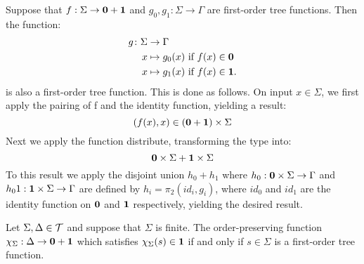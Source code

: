 \bigskip
\noindent \begin{example} Suppose that $f : \Sigma \to \mathbf{0}+\mathbf{1}$ and $g_0, g_1 : \Sigma \to\Gamma$ are first-order tree functions. Then the function:
 \begin{align*}
  g\colon \Sigma &\to \Gamma \\
  x &\mapsto g_0(x)  \text{ if } f(x)\in\mathbf{0}\\
  x &\mapsto g_1(x)  \text{ if } f(x)\in\mathbf{1}.
\end{align*}
 is also a first-order tree function. This is done as follows. On input
$x\in\Sigma$, we first apply the pairing of f and the identity function, yielding a result:
$$ (f(x),x)\in(\mathbf{0}+\mathbf{1})\times\Sigma$$
Next we apply the function distribute, transforming the type into:
$$ \mathbf{0}\times\Sigma+\mathbf{1}\times\Sigma$$
To this result we apply the disjoint union $h_0 + h_1$ where $h_0:\mathbf{0}\times\Sigma\to \Gamma$ and
$h_01:\mathbf{1}\times\Sigma\to \Gamma$ are defined by $h_i=\pi_2(id_i,g_i)$, where $id_0$ and $id_1$ are the identity function on $\mathbf{0}$ and $\mathbf{1}$ respectively, yielding the desired result.
\end{example}

\bigskip
\noindent \begin{example}
\end{example}

\bigskip
\noindent \begin{example}
Let $\Sigma, \Delta\in {\mathcal T}$ and suppose that $\Sigma$ is finite. 
The order-preserving function $\chi_\Sigma:\Delta\to \mathbf{0}+\mathbf{1}$ which satisfies $\chi_\Sigma(s)\in \mathbf{1}$ if and only if $s\in \Sigma$ is a first-order tree function. 
\end{example}

